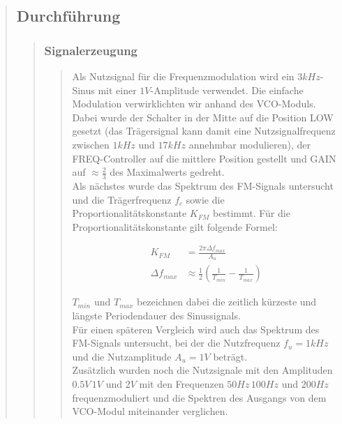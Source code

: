 \begin{quote}
    \subsection{Durchführung}
    \begin{quote}
        \subsubsection{Signalerzeugung}
        \begin{quote}
        Als Nutzsignal für die Frequenzmodulation wird ein $3 kHz$-Sinus mit
        einer $1 V$-Amplitude verwendet. Die einfache Modulation verwirklichten
        wir anhand des VCO-Moduls. Dabei wurde der Schalter in der Mitte auf
        die Position LOW gesetzt (das Trägersignal kann damit eine
        Nutzsignalfrequenz zwischen $1 kHz$ und $17 kHz$ annehmbar modulieren),
        der FREQ-Controller auf die mittlere Position gestellt und GAIN auf
        $\approx \frac{2}{3}$ des Maximalwerts gedreht.\\
        Als nächstes wurde das Spektrum des FM-Signals untersucht und die
        Trägerfrequenz $f_c$ sowie die Proportionalitätskonstante $K_{FM}$
        bestimmt. Für die Proportionalitätskonstante gilt folgende Formel:
        
        \begin{equation*}
    	\begin{split}
    		K_{FM} &= \frac{2 \pi \Delta f_{max}}{A_u}\\
			\Delta f_{max} &\approx \frac{1}{2} (\frac{1}{T_{min}} - \frac{1}{T_{max}})    		
    	\end{split}
    	\end{equation*}
    	
   		$T_{min}$ und $T_{max}$ bezeichnen dabei die zeitlich kürzeste und längste
   		Periodendauer des Sinussignals.\\
   		Für einen späteren Vergleich wird auch das Spektrum des FM-Signals
   		untersucht, bei der die Nutzfrequenz $f_u = 1 kHz$ und die Nutzamplitude
   		$A_u = 1 V$ beträgt.\\
   		Zusätzlich wurden noch die Nutzsignale mit den Amplituden $0.5 V\, 1 V$ und
   		$2 V$ mit den Frequenzen $50 Hz\, 100 Hz$ und $200 Hz$ frequenzmoduliert
   		und die Spektren des Ausgangs von dem VCO-Modul miteinander verglichen. 
        \end{quote}
        

\end{quote}
\end{quote}
